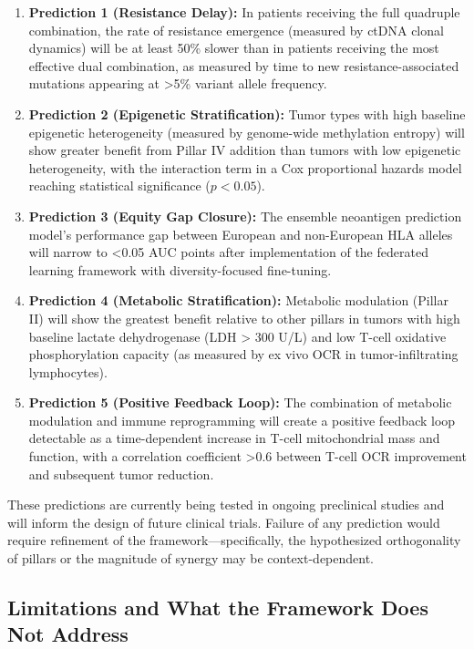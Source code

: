 \documentclass[12pt,a4paper]{article}
\begin{document}
\begin{enumerate}
    \item \textbf{Prediction 1 (Resistance Delay):} In patients receiving the full quadruple combination, the rate of resistance emergence (measured by ctDNA clonal dynamics) will be at least 50\% slower than in patients receiving the most effective dual combination, as measured by time to new resistance-associated mutations appearing at >5\% variant allele frequency.
    
    \item \textbf{Prediction 2 (Epigenetic Stratification):} Tumor types with high baseline epigenetic heterogeneity (measured by genome-wide methylation entropy) will show greater benefit from Pillar IV addition than tumors with low epigenetic heterogeneity, with the interaction term in a Cox proportional hazards model reaching statistical significance ($p < 0.05$).
    
    \item \textbf{Prediction 3 (Equity Gap Closure):} The ensemble neoantigen prediction model's performance gap between European and non-European HLA alleles will narrow to <0.05 AUC points after implementation of the federated learning framework with diversity-focused fine-tuning.
    
    \item \textbf{Prediction 4 (Metabolic Stratification):} Metabolic modulation (Pillar II) will show the greatest benefit relative to other pillars in tumors with high baseline lactate dehydrogenase (LDH > 300 U/L) and low T-cell oxidative phosphorylation capacity (as measured by ex vivo OCR in tumor-infiltrating lymphocytes).
    
    \item \textbf{Prediction 5 (Positive Feedback Loop):} The combination of metabolic modulation and immune reprogramming will create a positive feedback loop detectable as a time-dependent increase in T-cell mitochondrial mass and function, with a correlation coefficient >0.6 between T-cell OCR improvement and subsequent tumor reduction.
\end{enumerate}

These predictions are currently being tested in ongoing preclinical studies and will inform the design of future clinical trials. Failure of any prediction would require refinement of the framework—specifically, the hypothesized orthogonality of pillars or the magnitude of synergy may be context-dependent.

\subsection{Limitations and What the Framework Does Not Address}
\end{document}
